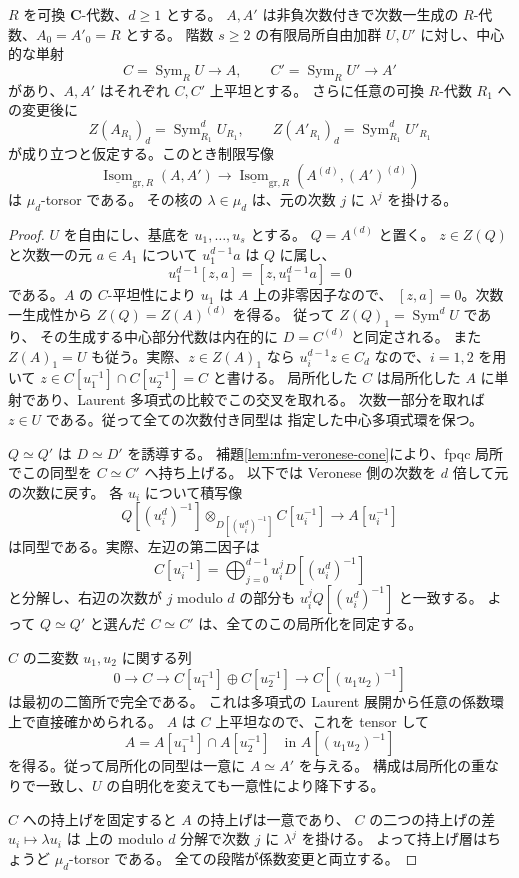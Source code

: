 \begin{theorem}
\label{thm:nfm-central-veronese}
$R$ を可換 $\mathbf C$-代数、$d\geq1$ とする。
$A,A'$ は非負次数付きで次数一生成の $R$-代数、$A_0=A'_0=R$ とする。
階数 $s\geq2$ の有限局所自由加群 $U,U'$ に対し、中心的な単射
\[
 C=\operatorname{Sym}_R U\longrightarrow A,
 \qquad C'=\operatorname{Sym}_R U'\longrightarrow A'
\]
があり、$A,A'$ はそれぞれ $C,C'$ 上平坦とする。
さらに任意の可換 $R$-代数 $R_1$ への変更後に
\[
 Z(A_{R_1})_d=\operatorname{Sym}^d_{R_1}U_{R_1},
 \qquad
 Z(A'_{R_1})_d=\operatorname{Sym}^d_{R_1}U'_{R_1}
\]
が成り立つと仮定する。このとき制限写像
\[
 \underline{\operatorname{Isom}}_{\mathrm{gr},R}(A,A')
 \longrightarrow
 \underline{\operatorname{Isom}}_{\mathrm{gr},R}(A^{(d)},(A')^{(d)})
\]
は $\mu_d$-torsor である。
その核の $\lambda\in\mu_d$ は、元の次数 $j$ に $\lambda^j$ を掛ける。
\end{theorem}

\begin{proof}
$U$ を自由にし、基底を $u_1,\ldots,u_s$ とする。
$Q=A^{(d)}$ と置く。
$z\in Z(Q)$ と次数一の元 $a\in A_1$ について
$u_1^{d-1}a$ は $Q$ に属し、
\[
 u_1^{d-1}[z,a]=[z,u_1^{d-1}a]=0
\]
である。$A$ の $C$-平坦性により $u_1$ は $A$ 上の非零因子なので、
$[z,a]=0$。次数一生成性から
$Z(Q)=Z(A)^{(d)}$ を得る。
従って $Z(Q)_1=\operatorname{Sym}^dU$ であり、
その生成する中心部分代数は内在的に $D=C^{(d)}$ と同定される。
また $Z(A)_1=U$ も従う。実際、$z\in Z(A)_1$ なら
$u_i^{d-1}z\in C_d$ なので、$i=1,2$ を用いて
$z\in C[u_1^{-1}]\cap C[u_2^{-1}]=C$ と書ける。
局所化した $C$ は局所化した $A$ に単射であり、Laurent 多項式の比較でこの交叉を取れる。
次数一部分を取れば $z\in U$ である。従って全ての次数付き同型は
指定した中心多項式環を保つ。

$Q\simeq Q'$ は $D\simeq D'$ を誘導する。
補題\ref{lem:nfm-veronese-cone}により、fpqc 局所でこの同型を
$C\simeq C'$ へ持ち上げる。
以下では Veronese 側の次数を $d$ 倍して元の次数に戻す。
各 $u_i$ について積写像
\[
 Q[(u_i^d)^{-1}]
 \otimes_{D[(u_i^d)^{-1}]}C[u_i^{-1}]
 \longrightarrow A[u_i^{-1}]
\]
は同型である。実際、左辺の第二因子は
\[
 C[u_i^{-1}]
 =\bigoplus_{j=0}^{d-1}u_i^jD[(u_i^d)^{-1}]
\]
と分解し、右辺の次数が $j$ modulo $d$ の部分も
$u_i^jQ[(u_i^d)^{-1}]$ と一致する。
よって $Q\simeq Q'$ と選んだ $C\simeq C'$ は、全てのこの局所化を同定する。

$C$ の二変数 $u_1,u_2$ に関する列
\[
 0\longrightarrow C\longrightarrow
 C[u_1^{-1}]\oplus C[u_2^{-1}]
 \longrightarrow C[(u_1u_2)^{-1}]
\]
は最初の二箇所で完全である。
これは多項式の Laurent 展開から任意の係数環上で直接確かめられる。
$A$ は $C$ 上平坦なので、これを tensor して
\[
 A=A[u_1^{-1}]\cap A[u_2^{-1}]
 \quad\text{in }A[(u_1u_2)^{-1}]
\]
を得る。従って局所化の同型は一意に $A\simeq A'$ を与える。
構成は局所化の重なりで一致し、$U$ の自明化を変えても一意性により降下する。

$C$ への持上げを固定すると $A$ の持上げは一意であり、
$C$ の二つの持上げの差 $u_i\mapsto\lambda u_i$ は
上の modulo $d$ 分解で次数 $j$ に $\lambda^j$ を掛ける。
よって持上げ層はちょうど $\mu_d$-torsor である。
全ての段階が係数変更と両立する。
\end{proof}

